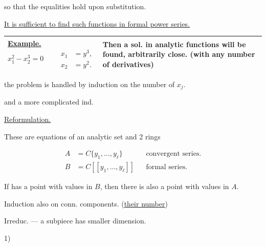 so that the equalities hold upon substitution.

\underline{It is sufficient to find such functions in formal power series.}

\noindent\begin{tabular}{@{}p{.44\linewidth}|p{.48\linewidth}@{}}
\underline{Example.}
\begin{equation*}x_1^2-x_2^3=0\qquad\begin{aligned}x_1&=y^3,\\x_2&=y^2.\end{aligned}\end{equation*}
& Then a sol. in analytic functions will be found, arbitrarily close. (with any number of derivatives)\\\hline
\end{tabular}





the problem is handled by induction on the number of $x_j$.

and a more complicated ind.

\underline{Reformulation.}

These are equations of an analytic set and 2 rings

\begin{align*}
A&=C\{y_1,\ldots, y_\ell\}&&\text{convergent series.}\\
B&=C[[y_1,\ldots, y_\ell]]&&\text{formal series.}
\end{align*}

If  has a point with values in $B$, then there is also a point with values in $A$.







Induction also on conn. components. (\underline{\underline{their number}})

Irreduc. --- a subpiece has smaller dimension.

1) 





